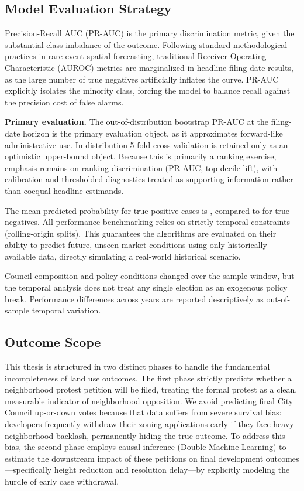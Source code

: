 \documentclass[11pt, letterpaper, oneside]{article}
\begin{document}
  \subsection{Model Evaluation Strategy}

Precision-Recall AUC (PR-AUC) is the primary discrimination metric, given the substantial class imbalance of the outcome. Following standard methodological practices in rare-event spatial forecasting, traditional Receiver Operating Characteristic (AUROC) metrics are marginalized in headline filing-date results, as the large number of true negatives artificially inflates the curve. PR-AUC explicitly isolates the minority class, forcing the model to balance recall against the precision cost of false alarms.

\textbf{Primary evaluation.} The out-of-distribution bootstrap PR-AUC at the filing-date horizon is the primary evaluation object, as it approximates forward-like administrative use. In-distribution 5-fold cross-validation is retained only as an optimistic upper-bound object. Because this is primarily a ranking exercise, emphasis remains on ranking discrimination (PR-AUC, top-decile lift), with calibration and thresholded diagnostics treated as supporting information rather than coequal headline estimands.


The mean predicted probability for true positive cases is \metricMeanProbTP{}, compared to \metricMeanProbTN{} for true negatives. All performance benchmarking relies on strictly temporal constraints (rolling-origin splits). This guarantees the algorithms are evaluated on their ability to predict future, unseen market conditions using only historically available data, directly simulating a real-world historical scenario.

Council composition and policy conditions changed over the sample window, but the temporal analysis does not treat any single election as an exogenous policy break. Performance differences across years are reported descriptively as out-of-sample temporal variation.


\subsection{Outcome Scope}
\label{sec:supporting_stages}

This thesis is structured in two distinct phases to handle the fundamental incompleteness of land use outcomes. The first phase strictly predicts whether a neighborhood protest petition will be filed, treating the formal protest as a clean, measurable indicator of neighborhood opposition. We avoid predicting final City Council up-or-down votes because that data suffers from severe survival bias: developers frequently withdraw their zoning applications early if they face heavy neighborhood backlash, permanently hiding the true outcome. To address this bias, the second phase employs causal inference (Double Machine Learning) to estimate the downstream impact of these petitions on final development outcomes---specifically height reduction and resolution delay---by explicitly modeling the hurdle of early case withdrawal.
\end{document}
